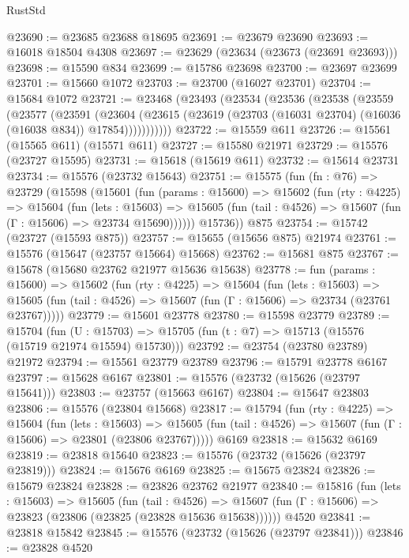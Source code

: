 \begin{lexlean}{RustStd}
\begin{coremodule}
@23690 := @23685 @23688 @18695
@23691 := @23679 @23690
@23693 := @16018 @18504 @4308
@23697 := @23629 (@23634 (@23673 (@23691 @23693)))
@23698 := @15590 @834
@23699 := @15786 @23698
@23700 := @23697 @23699
@23701 := @15660 @1072
@23703 := @23700 (@16027 @23701)
@23704 := @15684 @1072
@23721 := @23468
    (@23493
      (@23534
        (@23536
          (@23538
            (@23559
              (@23577
                (@23591
                  (@23604
                    (@23615 (@23619 (@23703 (@16031 @23704) (@16036 (@16038 @834)) @17854)))))))))))
@23722 := @15559 @611
@23726 := @15561 (@15565 @611) (@15571 @611)
@23727 := @15580 @21971
@23729 := @15576 (@23727 @15595)
@23731 := @15618 (@15619 @611)
@23732 := @15614 @23731
@23734 := @15576 (@23732 @15643)
@23751 := @15575
    (fun (fn : @76) =>
    @23729
      (@15598
        (@15601
          (fun (params : @15600) =>
          @15602
            (fun (rty : @4225) =>
            @15604
              (fun (lets : @15603) =>
              @15605 (fun (tail : @4526) => @15607 (fun (Γ : @15606) => @23734 @15690))))))
        @15736))
    @875
@23754 := @15742 (@23727 (@15593 @875))
@23757 := @15655 (@15656 @875) @21974
@23761 := @15576 (@15647 (@23757 @15664) @15668)
@23762 := @15681 @875
@23767 := @15678 (@15680 @23762 @21977 @15636 @15638)
@23778 := fun (params : @15600) =>
  @15602
    (fun (rty : @4225) =>
    @15604
      (fun (lets : @15603) =>
      @15605 (fun (tail : @4526) => @15607 (fun (Γ : @15606) => @23734 (@23761 @23767)))))
@23779 := @15601 @23778
@23780 := @15598 @23779
@23789 := @15704
    (fun (U : @15703) => @15705 (fun (t : @7) => @15713 (@15576 (@15719 @21974 @15594) @15730)))
@23792 := @23754 (@23780 @23789) @21972
@23794 := @15561 @23779 @23789
@23796 := @15791 @23778 @6167
@23797 := @15628 @6167
@23801 := @15576 (@23732 (@15626 (@23797 @15641)))
@23803 := @23757 (@15663 @6167)
@23804 := @15647 @23803
@23806 := @15576 (@23804 @15668)
@23817 := @15794
    (fun (rty : @4225) =>
    @15604
      (fun (lets : @15603) =>
      @15605 (fun (tail : @4526) => @15607 (fun (Γ : @15606) => @23801 (@23806 @23767)))))
    @6169
@23818 := @15632 @6169
@23819 := @23818 @15640
@23823 := @15576 (@23732 (@15626 (@23797 @23819)))
@23824 := @15676 @6169
@23825 := @15675 @23824
@23826 := @15679 @23824
@23828 := @23826 @23762 @21977
@23840 := @15816
    (fun (lets : @15603) =>
    @15605
      (fun (tail : @4526) =>
      @15607 (fun (Γ : @15606) => @23823 (@23806 (@23825 (@23828 @15636 @15638))))))
    @4520
@23841 := @23818 @15842
@23845 := @15576 (@23732 (@15626 (@23797 @23841)))
@23846 := @23828 @4520

\end{coremodule}
\end{lexlean}
